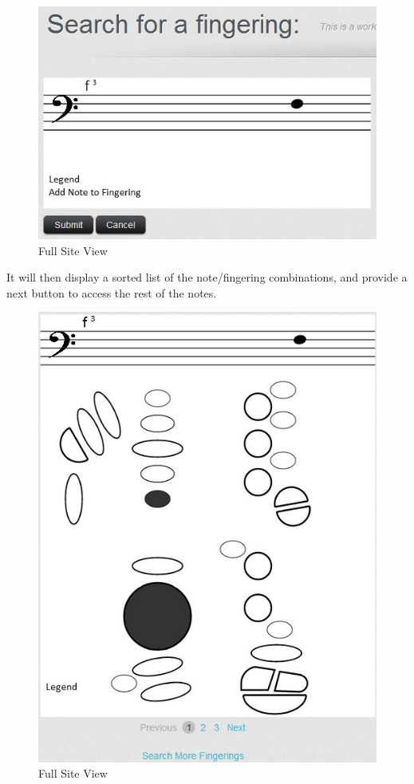 \documentclass[12pt,english]{article}
\begin{document}
\begin{figure}[H]
\caption{Full Site View}
\includegraphics[scale=0.75]{5} 
\end{figure}

\clearpage
It will then display a sorted list of the note/fingering combinations, and 
provide a next button to access the rest of the notes.

\begin{figure}[H]
\caption{Full Site View}
\includegraphics[scale=0.75]{7} 
\end{figure}
\end{document}
